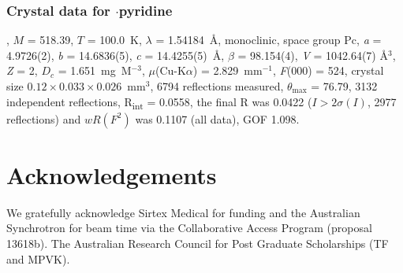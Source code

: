 \begin{refsection}
    \subsubsection{Crystal data for \texorpdfstring{$\cdot$pyridine}{C19H12N4O4Se.C5H5N}}
    , $M$ = 518.39, $T$ = 100.0~K, $\lambda$ = 1.54184~\AA, monoclinic, space group Pc, \emph{a} = 4.9726(2), \emph{b} = 14.6836(5), \emph{c} = 14.4255(5)~\AA, $\beta$ = 98.154(4)\degree, \emph{V} = 1042.64(7) \AA$^3$, \emph{Z} = 2, $D_c$ = 1.651~mg~M$^{-3}$, $\mu$(Cu-K$\alpha$) = 2.829~mm$^{-1}$, \emph{F}(000) = 524, crystal size $0.12 \times 0.033 \times 0.026$~mm$^3$, 6794 reflections measured, $\theta_{\max}$ = 76.79\degree, 3132 independent reflections, R\textsubscript{int} = 0.0558, the final R was 0.0422 ($I > 2\sigma(I)$, 2977 reflections) and $wR(F^2)$ was 0.1107 (all data), GOF 1.098.
    
    \section{Acknowledgements}
    We gratefully acknowledge Sirtex Medical for funding and the Australian Synchrotron for beam time via the Collaborative Access Program (proposal 13618b).
    The Australian Research Council for Post Graduate Scholarships (TF and MPVK).
    
    \printbibliography[heading=subbibliography]
    \end{refsection}
    